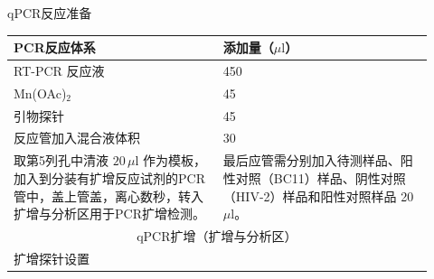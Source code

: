 \documentclass[UTF8,10pt,a4paper,fontset=fandol]{ctexart}
\newcommand{\fieldvalue}[1]{#1}
\newcommand{\handwritten}[1]{#1}
\begin{document}
\begin{center}
qPCR反应准备
\end{center}

\begin{tabular}{|p{0.46\linewidth}|p{0.46\linewidth}|}
\hline
PCR反应体系 & 添加量（$\mu\mathrm{l}$）\\
\hline
RT-PCR 反应液 &
\fieldvalue{\handwritten{450}}\\
\hline
Mn(OAc)$_2$ &
\fieldvalue{\handwritten{45}}\\
\hline
引物探针 &
\fieldvalue{\handwritten{45}}\\
\hline
反应管加入混合液体积 &
\fieldvalue{\handwritten{30}}\\
\hline
取第5列孔中清液 $20\,\mu\mathrm{l}$ 作为模板，加入到分装有扩增反应试剂的PCR管中，盖上管盖，离心数秒，转入扩增与分析区用于PCR扩增检测。 &
最后应管需分别加入待测样品、阳性对照（BC11）样品、阴性对照（HIV-2）样品和阳性对照样品
\fieldvalue{\handwritten{20}} $\mu\mathrm{l}$。
\\
\hline
\multicolumn{2}{|c|}{qPCR扩增（扩增与分析区）}\\
\hline
扩增探针设置 & \\
\hline
\end{tabular}

\newpage
\end{document}
